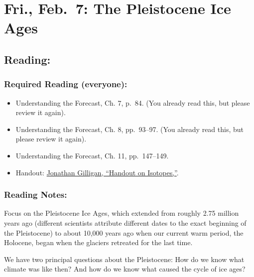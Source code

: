 \documentclass[
]{article}
\providecommand{\tightlist}{%
  \setlength{\itemsep}{0pt}\setlength{\parskip}{0pt}}
\begin{document}
\hypertarget{fri.-feb.-7-the-pleistocene-ice-ages}{%
\section{Fri., Feb.~7: The Pleistocene Ice
Ages}\label{fri.-feb.-7-the-pleistocene-ice-ages}}

\hypertarget{reading-13}{%
\subsection{Reading:}\label{reading-13}}

\hypertarget{required-reading-everyone-11}{%
\subsubsection{Required Reading
(everyone):}\label{required-reading-everyone-11}}

\begin{itemize}
\tightlist
\item
  Understanding the Forecast, Ch. 7, p.~84. (You already read this, but
  please review it again).
\item
  Understanding the Forecast, Ch. 8, pp.~93--97. (You already read this,
  but please review it again).
\item
  Understanding the Forecast, Ch. 11, pp.~147--149.
\item
  Handout: \href{/files/reading_handouts/Isotope_Handout.pdf}{Jonathan
  Gilligan, ``Handout on Isotopes,''}.
\end{itemize}

\hypertarget{reading-notes-11}{%
\subsubsection{Reading Notes:}\label{reading-notes-11}}

Focus on the Pleistocene Ice Ages, which extended from roughly 2.75
million years ago (different scientists attribute different dates to the
exact beginning of the Pleistocene) to about 10,000 years ago when our
current warm period, the Holocene, began when the glaciers retreated for
the last time.

We have two principal questions about the Pleistocene: How do we know
what climate was like then? And how do we know what caused the cycle of
ice ages?
\end{document}
